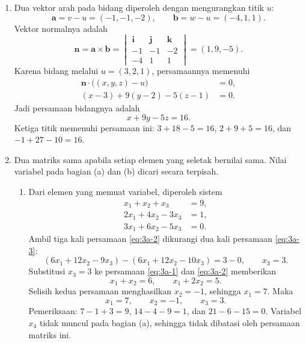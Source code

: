 \documentclass[11pt,a4paper]{article}
\begin{document}
\begin{enumerate}
\begin{enumerate}
Vektor normal bidang yang dibentuk oleh $v$ dan $w$ dapat dipilih sebagai
\[
    \boxed{\mathbf{n}=(-7,5,1)},
    \qquad
    \boxed{\widehat{\mathbf{n}}=\frac{1}{5\sqrt{3}}(-7,5,1)}
\]
untuk normal satuannya. Kelipatan skalar tak nol dari $\mathbf{n}$ juga
merupakan vektor normal, termasuk arah yang berlawanan.

\end{enumerate}

\item 
Dua vektor arah pada bidang diperoleh dengan mengurangkan titik $u$:
\[
    \mathbf{a}=v-u=(-1,-1,-2),\qquad
    \mathbf{b}=w-u=(-4,1,1).
\]
Vektor normalnya adalah
\[
    \mathbf{n}=\mathbf{a}\times\mathbf{b}
    =\begin{vmatrix}
        \mathbf{i} & \mathbf{j} & \mathbf{k} \\
        -1 & -1 & -2 \\
        -4 & 1 & 1
    \end{vmatrix}
    =(1,9,-5).
\]
Karena bidang melalui $u=(3,2,1)$, persamaannya memenuhi
\begin{align*}
    \mathbf{n}\cdot\bigl((x,y,z)-u\bigr)&=0,\\
    (x-3)+9(y-2)-5(z-1)&=0.
\end{align*}
Jadi persamaan bidangnya adalah
\[
    \boxed{x+9y-5z=16}.
\]
Ketiga titik memenuhi persamaan ini:
$3+18-5=16$, $2+9+5=16$, dan $-1+27-10=16$.

\item 
Dua matriks sama apabila setiap elemen yang seletak bernilai sama.
Nilai variabel pada bagian (a) dan (b) dicari secara terpisah.

\begin{enumerate}
\item
Dari elemen yang memuat variabel, diperoleh sistem
\begin{align}
    x_1+x_2+x_3&=9,\label{eq:3a-1}\\
    2x_1+4x_2-3x_3&=1,\label{eq:3a-2}\\
    3x_1+6x_2-5x_3&=0.\label{eq:3a-3}
\end{align}
Ambil tiga kali persamaan \eqref{eq:3a-2} dikurangi dua kali persamaan
\eqref{eq:3a-3}:
\[
    (6x_1+12x_2-9x_3)-(6x_1+12x_2-10x_3)=3-0,
    \qquad x_3=3.
\]
Substitusi $x_3=3$ ke persamaan \eqref{eq:3a-1} dan \eqref{eq:3a-2}
memberikan
\[
    x_1+x_2=6,\qquad x_1+2x_2=5.
\]
Selisih kedua persamaan menghasilkan $x_2=-1$, sehingga $x_1=7$.
Maka
\[
    \boxed{x_1=7,\qquad x_2=-1,\qquad x_3=3}.
\]
Pemeriksaan: $7-1+3=9$, $14-4-9=1$, dan $21-6-15=0$.
Variabel $x_4$ tidak muncul pada bagian (a), sehingga tidak dibatasi
oleh persamaan matriks ini.


\end{enumerate}
\end{enumerate}
\end{document}
